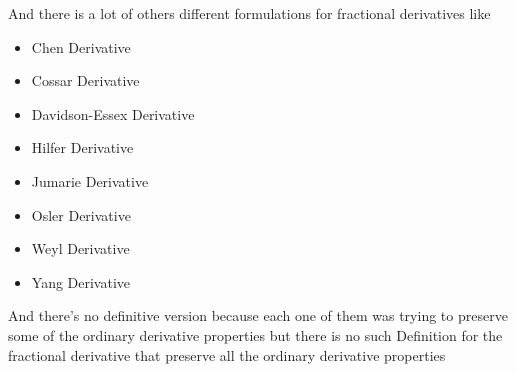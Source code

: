 And there is a lot of others different formulations for fractional derivatives like
\begin{itemize}
    \item Chen Derivative
    \item Cossar Derivative
    \item Davidson-Essex Derivative
    \item Hilfer Derivative
    \item Jumarie Derivative
    \item Osler Derivative
    \item Weyl Derivative
    \item Yang Derivative
\end{itemize}
And there's no definitive version because each one of them was trying to preserve some of the ordinary derivative 
properties but there is no such Definition for the fractional derivative that preserve all the ordinary derivative 
properties